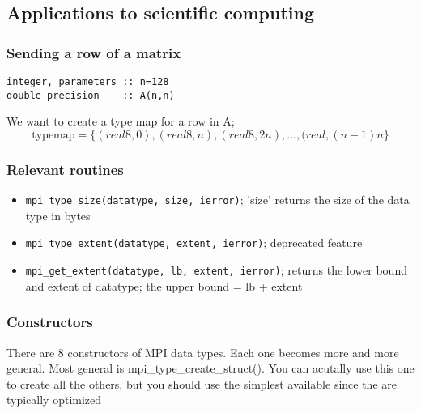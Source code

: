 \documentclass[10pt]{article}
\newenvironment{mitemize}
{
  \begin{itemize}
  \setlength{\itemsep}{1pt}
  \setlength{\parskip}{0pt}
  \setlength{\parsep}{0pt}}{\end{itemize}
}
\begin{document}
\subsection*{Applications to scientific computing}

\subsubsection*{Sending a row of a matrix}
\begin{verbatim}
integer, parameters :: n=128
double precision    :: A(n,n)
\end{verbatim}
We want to create a type map for a row in A; \[ \text{typemap} = \{ (real8, 0), (real8, n), (real8, 2n), ..., (real, (n-1)n \} \]

\subsubsection*{Relevant routines}
\begin{mitemize}
  \item \texttt{mpi\_type\_size(datatype, size, ierror)}; 'size' returns the size of the data type in bytes
  \item \texttt{mpi\_type\_extent(datatype, extent, ierror)}; deprecated feature
  \item \texttt{mpi\_get\_extent(datatype, lb, extent, ierror)}; returns the lower bound and extent of datatype; the upper bound = lb + extent
\end{mitemize}
  
\subsubsection*{Constructors}
There are 8 constructors of MPI data types. Each one becomes more and more general. Most general is mpi\_type\_create\_struct(). You can acutally use this one to create all the others, but you should use the simplest available since the are typically optimized
\end{document}
